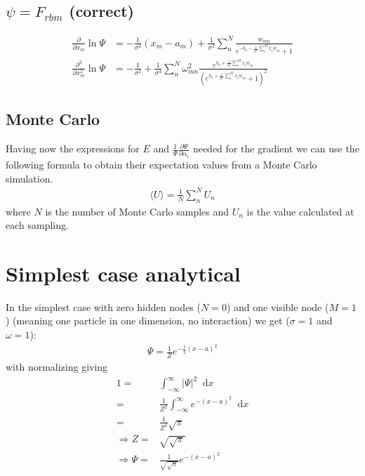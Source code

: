 \documentclass[norsk,a4paper,11pt]{article}
\newcommand*\diff{\mathop{}\!\mathrm{d}}
\begin{document}
\color{Blue}
\subsection{$\psi = F_{rbm}$ (correct)}
\color{Black}
\begin{align}
	\frac{\partial}{\partial x_m} \ln\Psi
	&= - \frac{1}{\sigma^2}(x_m - a_m) + \frac{1}{\sigma^2} \sum_n^N \frac{w_{mn}}{e^{-b_n - \frac{1}{\sigma^2}\sum_i^M x_i w_{in}} + 1} \\
	\frac{\partial^2}{\partial x_m^2} \ln\Psi
	&= - \frac{1}{\sigma^2} + \frac{1}{\sigma^4}\sum_n^N \omega_{mn}^2 \frac{e^{b_n + \frac{1}{\sigma^2}\sum_i^M x_i w_{in}}}{(e^{b_n + \frac{1}{\sigma^2}\sum_i^M x_i w_{in}} + 1)^2}
\end{align}

\subsection{Monte Carlo}
Having now the expressions for $E$ and $\frac{1}{\Psi} \frac{\partial\Psi}{\partial \alpha_i}$ needed for the gradient we can use the following formula to obtain their expectation values from a Monte Carlo simulation.
\begin{align}
	\langle U \rangle = \frac{1}{N}\sum_n^N U_n
\end{align}
where $N$ is the number of Monte Carlo samples and $U_n$ is the value calculated at each sampling.



\section{Simplest case analytical}
In the simplest case with zero hidden nodes ($N=0$) and one visible node ($M=1$) (meaning one particle in one dimension, no interaction) we get ($\sigma = 1$ and $\omega=1$):
\begin{align}
	\Psi = \frac{1}{Z} e^{-\frac{1}{2}(x-a)^2}
\end{align}
with normalizing giving
\begin{align}
	1=&\int_{-\infty}^\infty |\Psi|^2 \diff x \\
	=&\frac{1}{Z^2} \int_{-\infty}^\infty e^{-(x-a)^2} \diff x \\
	=&\frac{1}{Z^2} \sqrt{\pi} \\
\Rightarrow	Z =& \sqrt{\sqrt{\pi}} \\
\Rightarrow	\Psi =& \frac{1}{\sqrt{\sqrt{\pi}}} e^{-(x-a)^2}
\end{align}
\end{document}
